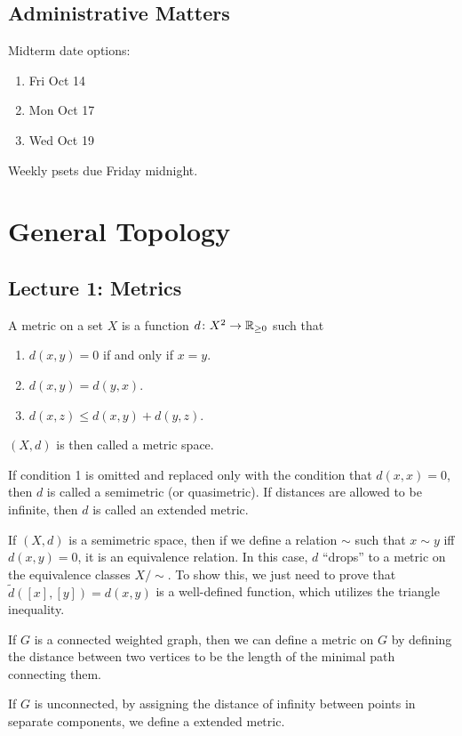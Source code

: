 \section*{Administrative Matters}
Midterm date options:
\begin{enumerate}
    \item Fri Oct 14
    \item Mon Oct 17
    \item Wed Oct 19
\end{enumerate}

Weekly psets due Friday midnight.

\chapter{General Topology}

\section{Lecture 1: Metrics}

\begin{definition}
    A metric on a set $X$ is a function $d\colon X^2 \to \mathbb R_{\ge 0}$ such that
    \begin{enumerate}
        \item $d(x, y) = 0$ if and only if $x = y$.
        \item $d(x, y) = d(y, x)$.
        \item $d(x, z) \le d(x, y) + d(y, z)$.
    \end{enumerate}

    $(X, d)$ is then called a metric space.
\end{definition}

If condition 1 is omitted and replaced only with the condition that $d(x, x) = 0$, then $d$ is called a semimetric (or quasimetric). If distances are allowed to be infinite, then $d$ is called an extended metric.

If $(X, d)$ is a semimetric space, then if we define a relation $\sim$ such that $x \sim y$ iff $d(x, y) = 0$, it is an equivalence relation. In this case, $d$ ``drops'' to a metric on the equivalence classes $X/\!\sim$. To show this, we just need to prove that $\tilde d([x], [y]) = d(x, y)$ is a well-defined function, which utilizes the triangle inequality.

\begin{example}
    If $G$ is a connected weighted graph, then we can define a metric on $G$ by defining the distance between two vertices to be the length of the minimal path connecting them.

    If $G$ is unconnected, by assigning the distance of infinity between points in separate components, we define a extended metric.
\end{example}

